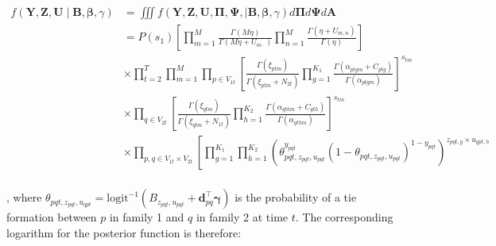 \documentclass{article}
\begin{document}
\begin{equation} \label{eq5}
\begin{aligned} 
f(\mathbf{Y}, \mathbf{Z},  \mathbf{U} \mid \mathbf{B}, \boldsymbol{\beta}, \gamma) & = \iiint f(\mathbf{Y}, \mathbf{Z}, \mathbf{U}, \boldsymbol{\Pi}, \boldsymbol{\Psi}, \mid \mathbf{B}, \boldsymbol{\beta}, \gamma) d \boldsymbol{\Pi} d \boldsymbol{\Psi}d \mathbf{A} \\
&= P(s_1) \left[ \prod_{m=1}^M \frac{\Gamma(M \eta)}{\Gamma\left(M \eta+U_{m \cdot}\right)} \prod_{n=1}^M \frac{\Gamma\left(\eta+U_{m, n}\right)}{\Gamma(\eta)} \right]\\
& \times \prod_{t=2}^T \prod_{m=1}^M \prod_{p \in V_{1t}} \left[ \frac{\Gamma\left(\xi_{ptm}\right)}{\Gamma \left( \xi_{ptm} + N_{2t} \right)}\prod_{g=1}^{K_1}\frac{ \Gamma\left( \alpha_{ptgm} + C_{ptg} \right)}{\Gamma\left(\alpha_{ptgm}\right)}  \right]^{s_{tm}} \\
&\times \prod_{q \in V_{2t}}  \left[ \frac{\Gamma\left(\xi_{qtm}\right)}{\Gamma \left( \xi_{qtm} + N_{1t} \right)}\prod_{h=1}^{K_2}\frac{ \Gamma\left( \alpha_{qthm} + C_{qth} \right)}{\Gamma\left(\alpha_{qthm}\right)}  \right]^{s_{tm}}    \\
& \times  \prod_{p, q \in V_{1t} \times V_{2t}}\left[ \prod_{g=1}^{K_1} \prod_{h=1}^{K_2} \left(\theta_{p q t, z_{p q t}, u_{p q t}}^{y_{p q t}}\left(1-\theta_{p q t, z_{p q t}, u_{p q t}}\right)^{1-y_{p q t}} \right)^{z_{pqt,g} \times u_{qpt,h}}\right. \\ 
\end{aligned}
\end{equation}

, where $\theta_{pqt, z_{pqt}, u_{qpt}} = \mathrm{logit}^{-1} (B_{z_{pqt},u_{pqt}} + \mathbf{d}_{pq}^\top \boldsymbol{\gamma})$ is the probability of a tie formation between $p$ in family 1 and $q$ in family 2 at time $t$. The corresponding logarithm for the posterior function is therefore:
\end{document}
